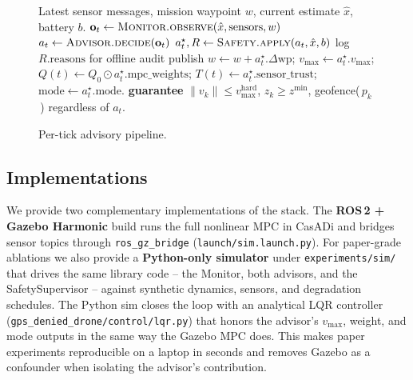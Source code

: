 \begin{figure}[t]
\centering
\begin{minipage}{0.95\linewidth}
\begin{algorithmic}[1]
\REQUIRE Latest sensor messages, mission waypoint $w$, current
         estimate $\hat x$, battery $b$.
\STATE $\mathbf{o}_t \gets \textsc{Monitor.observe}(\hat x, \text{sensors}, w)$
       \hfill {}
\STATE $a_t \gets \textsc{Advisor.decide}(\mathbf{o}_t)$
       \hfill {}
\STATE $a_t^\star, R \gets \textsc{Safety.apply}(a_t, \hat x, b)$
       \hfill {}
  \STATE log $R.\text{reasons}$ for offline audit
\ENDIF
\STATE publish $w \gets w + a_t^\star.\Delta\text{wp}$;
       $v_{\max} \gets a_t^\star.v_{\max}$;
       $Q(t) \gets Q_0 \odot a_t^\star.\text{mpc\_weights}$;
       $T(t) \gets a_t^\star.\text{sensor\_trust}$;
       $\text{mode} \gets a_t^\star.\text{mode}$.
\STATE \textbf{guarantee} $\|v_k\| \leq v_{\max}^{\text{hard}}$,
       $z_k \geq z^{\min}$, geofence(\,$p_k$\,) regardless of $a_t$.
\end{algorithmic}
\end{minipage}
\caption{Per-tick advisory pipeline.}
\label{alg:advisor}
\end{figure}

\subsection{Implementations}
\label{sec:impl}
We provide two complementary implementations of the stack. The
\textbf{ROS\,2 + Gazebo Harmonic} build runs the full nonlinear MPC
in CasADi and bridges sensor topics through \texttt{ros\_gz\_bridge}
(\texttt{launch/sim.launch.py}). For paper-grade ablations we also
provide a \textbf{Python-only simulator} under
\texttt{experiments/sim/} that drives the same library code -- the
Monitor, both advisors, and the SafetySupervisor -- against
synthetic dynamics, sensors, and degradation schedules. The
Python sim closes the loop with an analytical LQR controller
(\texttt{gps\_denied\_drone/control/lqr.py}) that honors the
advisor's $v_{\max}$, weight, and mode outputs in the same way the
Gazebo MPC does. This makes paper experiments reproducible on a
laptop in seconds and removes Gazebo as a confounder when
isolating the advisor's contribution.
